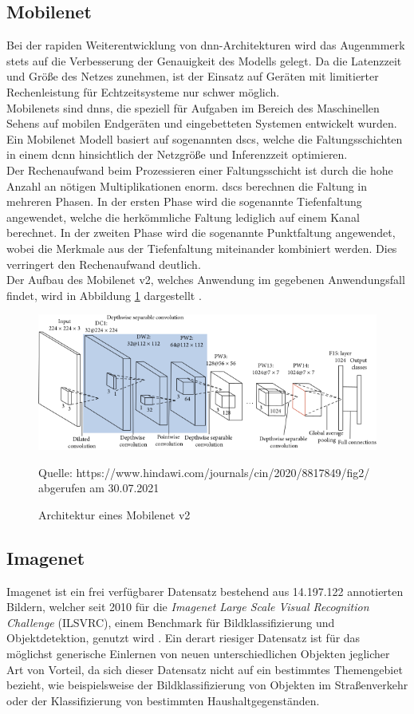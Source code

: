 \documentclass[oneside]{ausarbeitung}
\begin{document}
\subsection{Mobilenet}
Bei der rapiden Weiterentwicklung von \ac{dnn}-Architekturen wird das Augenmmerk stets auf die Verbesserung der Genauigkeit des Modells gelegt. Da die Latenzzeit und Größe des Netzes zunehmen, ist der Einsatz auf Geräten mit limitierter Rechenleistung für Echtzeitsysteme nur schwer möglich.\\
Mobilenets sind \acp{dnn}, die speziell für Aufgaben im Bereich des Maschinellen Sehens auf mobilen Endgeräten und eingebetteten Systemen entwickelt wurden. Ein Mobilenet Modell basiert auf sogenannten \acp{dsc}, welche die Faltungsschichten in einem \ac{dcnn} hinsichtlich der Netzgröße und Inferenzzeit optimieren. \\
Der Rechenaufwand beim Prozessieren einer Faltungsschicht ist durch die hohe Anzahl an nötigen Multiplikationen enorm. \acp{dsc} berechnen die Faltung in mehreren Phasen. In der ersten Phase wird die sogenannte Tiefenfaltung angewendet, welche die herkömmliche Faltung lediglich auf einem Kanal berechnet. In der zweiten Phase wird die sogenannte Punktfaltung angewendet, wobei die Merkmale aus der Tiefenfaltung miteinander kombiniert werden. Dies verringert den Rechenaufwand deutlich.\\
Der Aufbau des Mobilenet v2, welches Anwendung im gegebenen Anwendungsfall findet, wird in Abbildung \ref{fig:mobilenet-architecture} dargestellt \cite{mobilenet}.
\begin{figure}[hptb]
	\centering
	\includegraphics[height=0.27\textheight]{images/mobilenet-architecture.png}
	\caption{Architektur eines Mobilenet v2} Quelle: https://www.hindawi.com/journals/cin/2020/8817849/fig2/ abgerufen am 30.07.2021
	\label{fig:mobilenet-architecture}
\end{figure}

\subsection{Imagenet}
Imagenet ist ein frei verfügbarer Datensatz bestehend aus 14.197.122 annotierten Bildern, welcher seit 2010 für die \textit{Imagenet Large Scale Visual Recognition Challenge} (ILSVRC), einem Benchmark für Bildklassifizierung und Objektdetektion, genutzt wird \cite{imagenet}. Ein derart riesiger Datensatz ist für das möglichst generische Einlernen von neuen unterschiedlichen Objekten jeglicher Art von Vorteil, da sich dieser Datensatz nicht auf ein bestimmtes Themengebiet bezieht, wie beispielsweise der Bildklassifizierung von Objekten im Straßenverkehr oder der Klassifizierung von bestimmten Haushaltgegenständen. \\
\end{document}
